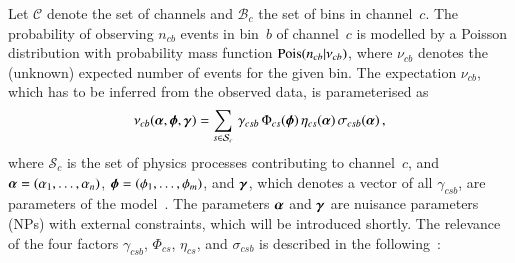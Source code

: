 Let $\mathcal{C}$ denote the set of channels and $\mathcal{B}_{c}$ the set of
bins in channel~$c$. The probability of observing $n_{cb}$ events in bin~$b$ of
channel~$c$ is modelled by a Poisson distribution with probability mass function
$\operatorname{Pois}(n_{cb} \vert \nu_{cb})$, where $\nu_{cb}$ denotes the (unknown) expected
number of events for the given bin. The expectation $\nu_{cb}$, which has to be
inferred from the observed data, is parameterised as
\begin{align*}
  \nu_{cb}(\myvec{\alpha}, \myvec{\phi}, \myvec{\gamma}) =
  \sum_{s \in \mathcal{S}_{c}} \, \gamma_{csb} \, \Phi_{cs}(\myvec{\phi}) \, \eta_{cs}(\myvec{\alpha}) \, \sigma_{csb}(\myvec{\alpha}) \,\text{,}
\end{align*}
where $\mathcal{S}_{c}$ is the set of physics processes contributing to
channel~$c$, and $\myvec{\alpha} = (\alpha_1, \dots, \alpha_n)$,
$\myvec{\phi} = (\phi_1, \dots, \phi_m)$, and $\myvec{\gamma}$, which denotes a
vector of all $\gamma_{csb}$, are parameters of the model~\cite{cranmer2012}.
The parameters $\myvec{\alpha}$ and $\myvec{\gamma}$ are nuisance parameters
(NPs) with external constraints, which will be introduced shortly. The relevance
of the four factors $\gamma_{csb}$, $\Phi_{cs}$, $\eta_{cs}$, and $\sigma_{csb}$
is described in the following~\cite{cranmer2012}:
